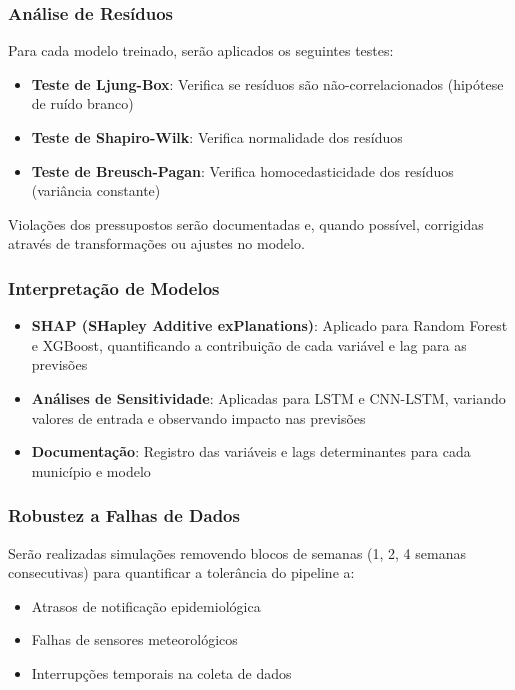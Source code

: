 \subsubsection{Análise de Resíduos}

Para cada modelo treinado, serão aplicados os seguintes testes:
\begin{itemize}
    \item \textbf{Teste de Ljung-Box}: Verifica se resíduos são não-correlacionados (hipótese de ruído branco)
    \item \textbf{Teste de Shapiro-Wilk}: Verifica normalidade dos resíduos
    \item \textbf{Teste de Breusch-Pagan}: Verifica homocedasticidade dos resíduos (variância constante)
\end{itemize}

Violações dos pressupostos serão documentadas e, quando possível, corrigidas através de transformações ou ajustes no modelo.

\subsubsection{Interpretação de Modelos}

\begin{itemize}
    \item \textbf{SHAP (SHapley Additive exPlanations)}: Aplicado para Random Forest e XGBoost, quantificando a contribuição de cada variável e lag para as previsões
    \item \textbf{Análises de Sensitividade}: Aplicadas para LSTM e CNN-LSTM, variando valores de entrada e observando impacto nas previsões
    \item \textbf{Documentação}: Registro das variáveis e lags determinantes para cada município e modelo
\end{itemize}

\subsubsection{Robustez a Falhas de Dados}

Serão realizadas simulações removendo blocos de semanas (1, 2, 4 semanas consecutivas) para quantificar a tolerância do pipeline a:
\begin{itemize}
    \item Atrasos de notificação epidemiológica
    \item Falhas de sensores meteorológicos
    \item Interrupções temporais na coleta de dados
\end{itemize}


